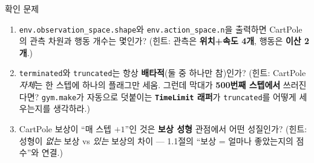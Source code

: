 \begin{frame}{확인 문제}
  \begin{enumerate}
    \item \texttt{env.observation\_space.shape}와
      \texttt{env.action\_space.n}을 출력하면 CartPole의 관측 차원과
      행동 개수는 몇인가? (힌트: 관측은 \textbf{위치+속도 4개},
      행동은 \textbf{이산 2개}.)
    \item \texttt{terminated}와 \texttt{truncated}는 항상
      \textbf{배타적}(둘 중 하나만 참)인가?
      (힌트: CartPole \textit{자체}는 한 스텝에 하나의 플래그만 세움.
      그런데 막대가 \textbf{500번째 스텝에서} 쓰러진다면?
      \texttt{gym.make}가 자동으로 덧붙이는 \textbf{\texttt{TimeLimit}
      래퍼}가 \texttt{truncated}를 어떻게 세우는지를 생각하라.)
    \item CartPole 보상이 ``매 스텝 $+1$''인 것은 \textbf{보상 성형}
      관점에서 어떤 성질인가? (힌트: 성형이 \textit{없는} 보상 vs
      \textit{있는} 보상의 차이 --- 1.1절의 ``보상 = 얼마나 좋았는지의
      점수''와 연결.)
  \end{enumerate}
\end{frame}
